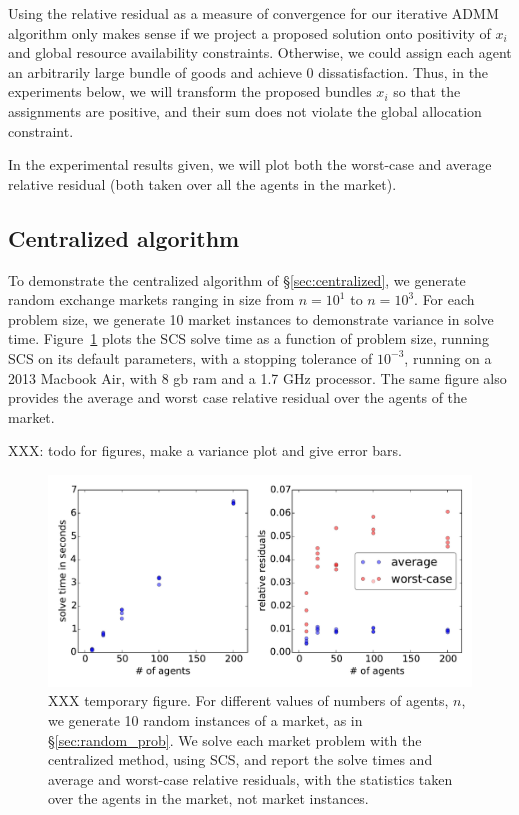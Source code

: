 \documentclass[12pt]{article}
\begin{document}
Using the relative residual as a measure of convergence for our iterative ADMM
algorithm only makes sense if we project a proposed solution onto positivity of
$x_i$ and global resource availability constraints. Otherwise, we could assign
each agent an arbitrarily large bundle of goods and achieve 0 dissatisfaction.
Thus, in the experiments below, we will transform the proposed bundles $x_i$ so
that the assignments are positive, and their sum does not violate the global
allocation constraint.

In the experimental results given, we will plot both the worst-case and average
relative residual (both taken over all the agents in the market).

\subsection{Centralized algorithm}
\label{sec:centralized_examples}
To demonstrate the centralized algorithm of \S\ref{sec:centralized},
we generate random exchange markets ranging in size from $n=10^1$ to $n=10^3$.
For each problem size, we generate 10 market instances to demonstrate variance
in solve time. Figure~\ref{f-cvxpy} plots the SCS solve time as a function of
problem size, running SCS on its default parameters, with a stopping tolerance
of $10^{-3}$, running on a 2013 Macbook Air, with 8 gb ram and a 1.7 GHz
processor. The same figure also provides the average and worst case relative
residual over the agents of the market.

XXX: todo for figures, make a variance plot and give error bars.

\begin{figure}
\begin{center}
\includegraphics[width=1.0\textwidth]{figures/cvxpy}
\end{center}
\caption{XXX temporary figure. For different values of numbers of agents, $n$,
we generate 10 random instances of a market, as in \S\ref{sec:random_prob}.
We solve each market problem with the centralized method, using SCS, and
report the solve times and average and worst-case relative residuals, with the
statistics taken over the agents in the market, not market instances.}
\label{f-cvxpy}
\end{figure}
\end{document}
